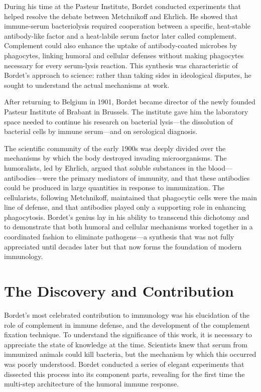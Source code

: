 During his time at the Pasteur Institute, Bordet conducted experiments that helped resolve the debate between Metchnikoff and Ehrlich. He showed that immune-serum bacteriolysis required cooperation between a specific, heat-stable antibody-like factor and a heat-labile serum factor later called complement. Complement could also enhance the uptake of antibody-coated microbes by phagocytes, linking humoral and cellular defenses without making phagocytes necessary for every serum-lysis reaction. This synthesis was characteristic of Bordet's approach to science: rather than taking sides in ideological disputes, he sought to understand the actual mechanisms at work.

After returning to Belgium in 1901, Bordet became director of the newly founded Pasteur Institute of Brabant in Brussels. The institute gave him the laboratory space needed to continue his research on bacterial lysis---the dissolution of bacterial cells by immune serum---and on serological diagnosis.\cite{bordet-biographical,bordet-history}

The scientific community of the early 1900s was deeply divided over the mechanisms by which the body destroyed invading microorganisms. The humoralists, led by Ehrlich, argued that soluble substances in the blood---antibodies---were the primary mediators of immunity, and that these antibodies could be produced in large quantities in response to immunization. The cellularists, following Metchnikoff, maintained that phagocytic cells were the main line of defense, and that antibodies played only a supporting role in enhancing phagocytosis. Bordet's genius lay in his ability to transcend this dichotomy and to demonstrate that both humoral and cellular mechanisms worked together in a coordinated fashion to eliminate pathogens---a synthesis that was not fully appreciated until decades later but that now forms the foundation of modern immunology.

\section{The Discovery and Contribution}

Bordet's most celebrated contribution to immunology was his elucidation of the role of complement in immune defense, and the development of the complement fixation technique. To understand the significance of this work, it is necessary to appreciate the state of knowledge at the time. Scientists knew that serum from immunized animals could kill bacteria, but the mechanism by which this occurred was poorly understood. Bordet conducted a series of elegant experiments that dissected this process into its component parts, revealing for the first time the multi-step architecture of the humoral immune response.

